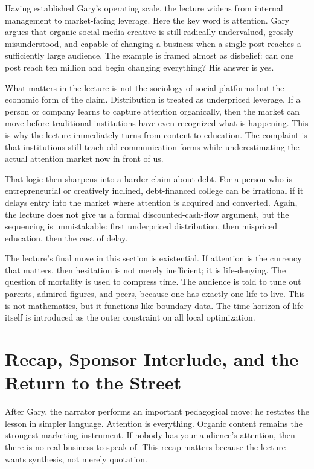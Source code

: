 Having established Gary's operating scale, the lecture widens from internal management to market-facing leverage. Here the key word is attention. Gary argues that organic social media creative is still radically undervalued, grossly misunderstood, and capable of changing a business when a single post reaches a sufficiently large audience. The example is framed almost as disbelief: can one post reach ten million and begin changing everything? His answer is yes.

What matters in the lecture is not the sociology of social platforms but the economic form of the claim. Distribution is treated as underpriced leverage. If a person or company learns to capture attention organically, then the market can move before traditional institutions have even recognized what is happening. This is why the lecture immediately turns from content to education. The complaint is that institutions still teach old communication forms while underestimating the actual attention market now in front of us.

That logic then sharpens into a harder claim about debt. For a person who is entrepreneurial or creatively inclined, debt-financed college can be irrational if it delays entry into the market where attention is acquired and converted. Again, the lecture does not give us a formal discounted-cash-flow argument, but the sequencing is unmistakable: first underpriced distribution, then mispriced education, then the cost of delay.

The lecture's final move in this section is existential. If attention is the currency that matters, then hesitation is not merely inefficient; it is life-denying. The question of mortality is used to compress time. The audience is told to tune out parents, admired figures, and peers, because one has exactly one life to live. This is not mathematics, but it functions like boundary data. The time horizon of life itself is introduced as the outer constraint on all local optimization.

\section{Recap, Sponsor Interlude, and the Return to the Street}

After Gary, the narrator performs an important pedagogical move: he restates the lesson in simpler language. Attention is everything. Organic content remains the strongest marketing instrument. If nobody has your audience's attention, then there is no real business to speak of. This recap matters because the lecture wants synthesis, not merely quotation.

